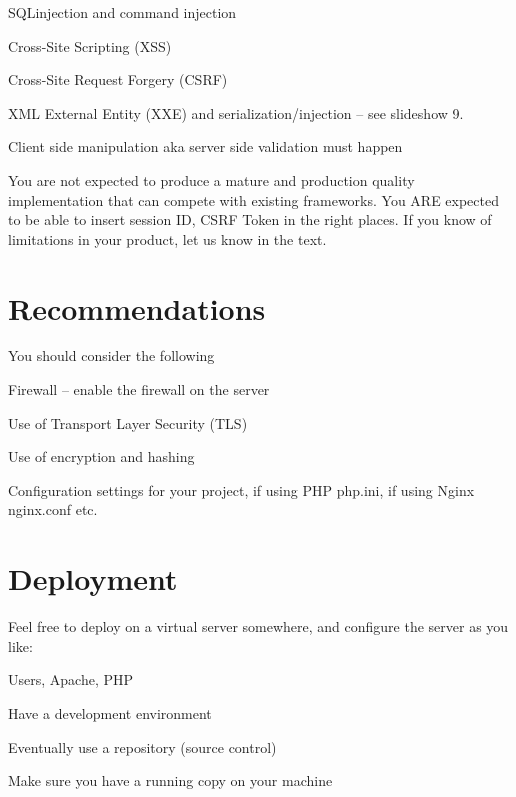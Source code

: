 \documentclass[a4paper,11pt,notitlepage]{report}
\begin{document}
\begin{list2}
\item SQLinjection and command injection
\item Cross-Site Scripting (XSS)
\item Cross-Site Request Forgery (CSRF)
\item XML External Entity (XXE) and serialization/injection -- see slideshow 9.
\item Client side manipulation aka server side validation must happen
\end{list2}

You are not expected to produce a mature and production quality implementation that can compete with existing frameworks. You ARE expected to be able to insert session ID, CSRF Token in the right places. If you know of limitations in your product, let us know in the text.

\section*{Recommendations}

You should consider the following
\begin{list2}
\item Firewall -- enable the firewall on the server
\item Use of Transport Layer Security (TLS)
\item Use of encryption and hashing
\item Configuration settings for your project, if using PHP php.ini, if using Nginx nginx.conf etc.
\end{list2}


\section*{Deployment}

Feel free to deploy on a virtual server somewhere, and configure the server as you like:
\begin{list2}
\item Users, Apache, PHP
\item Have a development environment
\item Eventually use a repository (source control)
\item Make sure you have a running copy on your machine
\end{list2}
\end{document}

